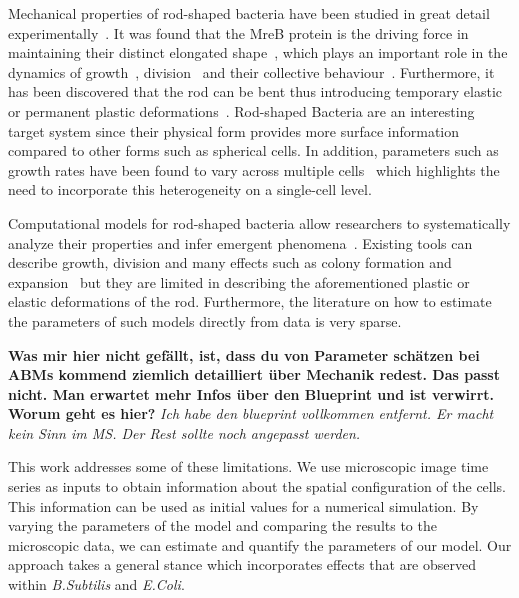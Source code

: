 \documentclass{article}
\begin{document}
Mechanical properties of rod-shaped bacteria have been studied in great detail
experimentally~\cite{Chatterjee1988,Takeuchi2005,IWAI2002}.
It was found that the MreB protein is the driving force in maintaining their distinct elongated
shape~\cite{Ursell2014}, which plays an important role in the dynamics of
growth~\cite{Billaudeau2017}, division~\cite{Harry2001} and their collective
behaviour~\cite{vanGestel2015,Balagam2015}.
Furthermore, it has been discovered that the rod can be bent thus introducing temporary elastic or
permanent plastic deformations~\cite{Amir2014_2}.
Rod-shaped Bacteria are an interesting target system since their physical form provides more surface
information compared to other forms such as spherical cells.
In addition, parameters such as growth rates have been found to vary across multiple
cells~\cite{Koutsoumanis2013} which highlights the need to incorporate this heterogeneity on a
single-cell level.

Computational models for rod-shaped bacteria allow researchers to systematically analyze their
properties and infer emergent phenomena~\cite{Cho2007,Jnsson2005}.
Existing tools can describe growth, division and many effects such as colony formation and
expansion~\cite{Matyjaszkiewicz2017,Doumic2020} but they are limited in describing the
aforementioned plastic or elastic deformations of the rod. Furthermore, the literature on how to
estimate the parameters of such models directly from data is very sparse.

\textbf{
    Was mir hier nicht gefällt, ist, dass du von Parameter schätzen bei ABMs kommend ziemlich
    detailliert über Mechanik redest.
    Das passt nicht.
    Man erwartet mehr Infos über den Blueprint und ist verwirrt.
    Worum geht es hier?
}
\textit{Ich habe den blueprint vollkommen entfernt. Er macht kein Sinn im MS. Der Rest sollte noch
angepasst werden.}

This work addresses some of these limitations.
We use microscopic image time series as inputs to obtain information about the spatial configuration
of the cells.
This information can be used as initial values for a numerical simulation.
By varying the parameters of the model and comparing the results to the microscopic data, we can
estimate and quantify the parameters of our model.
Our approach takes a general stance which incorporates effects that are observed within
\textit{B.Subtilis} and \textit{E.Coli}.

\end{document}
